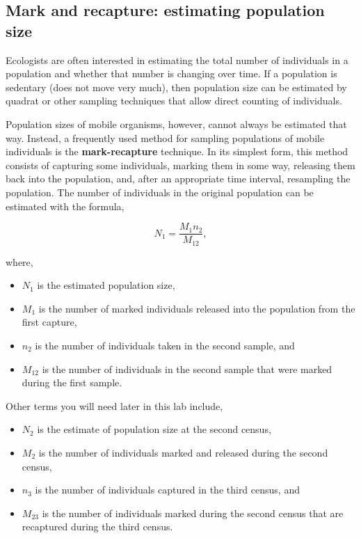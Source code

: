 \documentclass[12pt, hidelinks]{exam}
\begin{document}
\subsection*{Mark and recapture: estimating population size}

Ecologists are often interested in estimating the total number of
individuals in a population and whether that number is changing over
time. If a population is sedentary (does not move very much), then
population size can be estimated by quadrat
or other sampling techniques that allow direct counting of individuals. 

Population sizes of mobile organisms, however,
cannot always be estimated that way. Instead, a frequently used method 
for sampling populations of mobile individuals is the
\textbf{mark-recapture} technique. In its simplest form, this method consists of
capturing some individuals, marking them in some way, releasing them
back into the population, and, after an appropriate time interval,
resampling the population. The number of individuals in the original
population can be estimated with the formula,

\begin{equation} \label{eq:mark_recapture}
N_1 = \dfrac{M_1 n_2}{M_{12}},
\end{equation}

where,

\begin{itemize}
	\item $N_1$ is the estimated population size,
	\item $M_1$ is the number of marked individuals released into the
	population from the first capture,
	\item $n_2$ is the number of
	individuals taken in the second sample, and
	\item $M_{12}$ is the
	number of individuals in the second sample that were marked during the
	first sample.
\end{itemize}

Other terms you will need later in this lab include,

\begin{itemize}\label{eq:terms}
	\item $N_2$ is the estimate of population size at the second
census,

	\item $M_2$ is the number of individuals marked and released
during the second census,

	\item $n_3$ is the number of individuals captured in the third
census, and

	\item $M_{23}$ is the number of individuals marked during the second
census that are recaptured during the third census.
\end{itemize}
\end{document}
